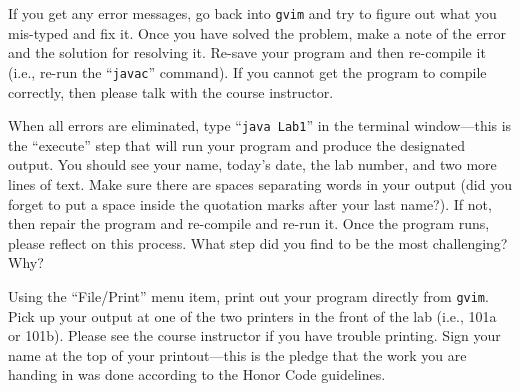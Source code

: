 
If you get any error messages, go back into {\tt gvim} and try to figure out what you mis-typed and fix it. Once you
have solved the problem, make a note of the error and the solution for resolving it. Re-save your program and then
re-compile it (i.e., re-run the ``{\tt javac}'' command). If you cannot get the program to compile correctly, then
please talk with the course instructor.

When all errors are eliminated, type ``{\tt java Lab1}'' in the terminal window---this is the ``execute'' step that will
run your program and produce the designated output.  You should see your name, today's date, the lab number, and two
more lines of text. Make sure there are spaces separating words in your output (did you forget to put a space inside the
quotation marks after your last name?). If not, then repair the program and re-compile and re-run it.  Once the program
runs, please reflect on this process.  What step did you find to be the most challenging? Why?




Using the ``File/Print'' menu item, print out your program directly from {\tt gvim}. Pick up your output at one of the
two printers in the front of the lab (i.e., 101a or 101b).  Please see the course instructor if you have trouble
printing.  Sign your name at the top of your printout---this is the pledge that the work you are handing in was done
according to the Honor Code guidelines.

